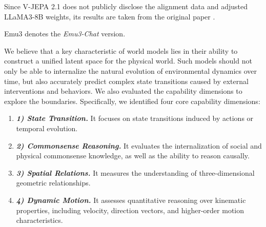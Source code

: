 \begin{table}[!htbp]
\begin{threeparttable}
    \begin{tablenotes}
    \footnotesize
    \item[1] Since V-JEPA 2.1 does not publicly disclose the alignment data and adjusted LLaMA3-8B weights, its results are taken from the original paper \citep{V-JEPA-2.1}.
    \item[2] Emu3 denotes the \textit{Emu3-Chat} version.
    \end{tablenotes}
  \end{threeparttable}
\end{table}





We believe that a key characteristic of world models lies in their ability to construct a unified latent space for the physical world. Such models should not only be able to internalize the natural evolution of environmental dynamics over time, but also accurately predict complex state transitions caused by external interventions and behaviors. 
We also evaluated the capability dimensions to explore the boundaries. Specifically, we identified four core capability dimensions: 



\vspace{-1ex}
\begin{enumerate}[
    leftmargin=1.35em,
    itemsep=0.35em,
    topsep=0.35em,
    parsep=0em
]
    \item[] \textbf{\textit{1) State Transition.}} 
    It focuses on state transitions induced by actions or temporal evolution. 
    
    \item[] \textbf{\textit{2) Commonsense Reasoning.}}
    It evaluates the internalization of social and physical commonsense knowledge, as well as the ability to reason causally. 
    
    \item[] \textbf{\textit{3) Spatial Relations.}}
    It measures the understanding of three-dimensional geometric relationships. 

    \item[] \textbf{\textit{4) Dynamic Motion.}}
    It assesses quantitative reasoning over kinematic properties, including velocity, direction vectors, and higher-order motion characteristics. 
\end{enumerate}


